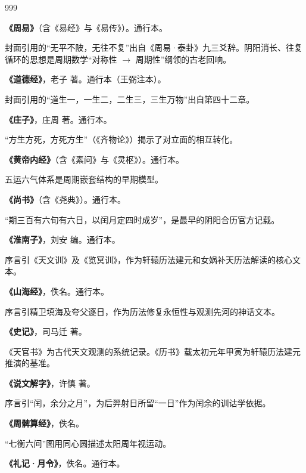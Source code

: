 \newpage

\cleardoublepage
{}
{}

\begingroup
\sloppy
\setlength{\emergencystretch}{3em}

\begin{thebibliography}{999}

 \textbf{《周易》}（含《易经》与《易传》）。通行本。

封面引用的“无平不陂，无往不复”出自《周易·泰卦》九三爻辞。阴阳消长、往复循环的思想是周期数学“对称性 $\to$ 周期性”纲领的古老回响。

 \textbf{《道德经》}，老子 著。通行本（王弼注本）。

封面引用的“道生一，一生二，二生三，三生万物”出自第四十二章。

 \textbf{《庄子》}，庄周 著。通行本。

“方生方死，方死方生”（《齐物论》）揭示了对立面的相互转化。

 \textbf{《黄帝内经》}（含《素问》与《灵枢》）。通行本。

五运六气体系是周期嵌套结构的早期模型。

 \textbf{《尚书》}（含《尧典》）。通行本。

“期三百有六旬有六日，以闰月定四时成岁”，是最早的阴阳合历官方记载。

 \textbf{《淮南子》}，刘安 编。通行本。

序言引《天文训》及《览冥训》，作为轩辕历法建元和女娲补天历法解读的核心文本。

 \textbf{《山海经》}，佚名。通行本。

序言引精卫填海及夸父逐日，作为历法修复永恒性与观测先河的神话文本。

 \textbf{《史记》}，司马迁 著。

《天官书》为古代天文观测的系统记录。《历书》载太初元年甲寅为轩辕历法建元推演的基准。

 \textbf{《说文解字》}，许慎 著。

序言引“闰，余分之月”，为后羿射日所留“一日”作为闰余的训诂学依据。

 \textbf{《周髀算经》}，佚名。

“七衡六间”图用同心圆描述太阳周年视运动。

 \textbf{《礼记·月令》}，佚名。通行本。


\end{thebibliography}
